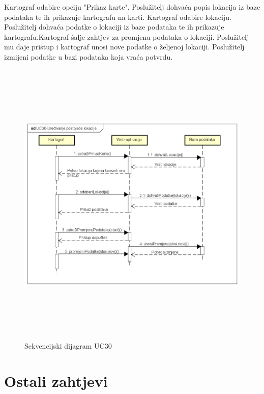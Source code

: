 					{Kartograf odabire opciju "Prikaz karte". Poslužitelj dohvaća popis lokacija iz baze podataka te ih prikazuje kartografu na karti. Kartograf odabire lokaciju. Poslužitelj dohvaća podatke o lokaciji iz baze podataka te ih prikazuje kartografu.Kartograf šalje zahtjev za promjenu podataka o lokaciji. Poslužitelj mu daje pristup i kartograf unosi nove podatke o željenoj lokaciji. Poslužitelj izmijeni podatke u bazi podataka koja vraća potvrdu.}\\
					
					\begin{figure}[H]
						\includegraphics[width=\linewidth, height=14cm]{dijagrami/sd_UC30}				
						\centering
						\caption{Sekvencijski dijagram UC30}
						\label{}
					\end{figure}
					
				
				\eject
	
		\section{Ostali zahtjevi}
		

